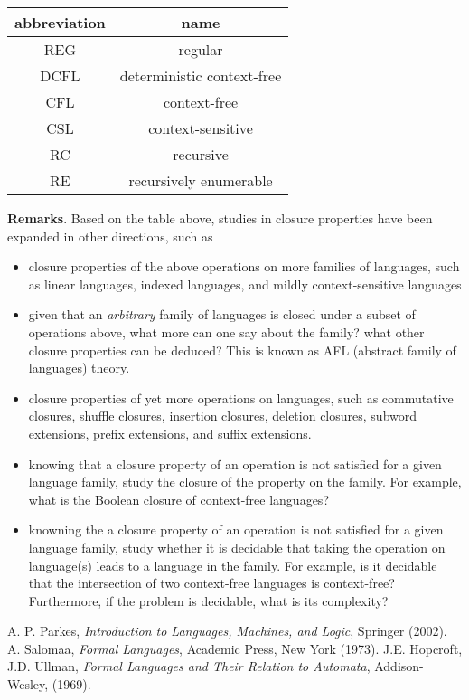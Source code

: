 \documentclass[12pt]{article}
\begin{document}
\begin{center}
\begin{tabular}{|c|c|}
\hline\hline
abbreviation & name \\
\hline\hline
REG & regular \\
\hline
DCFL & deterministic context-free \\
\hline
CFL & context-free \\
\hline
CSL & context-sensitive \\
\hline
RC & recursive \\
\hline
RE & recursively enumerable \\
\hline
\end{tabular}
\end{center}

\textbf{Remarks}.  Based on the table above, studies in closure properties have been expanded in other directions, such as
\begin{itemize}
\item closure properties of the above operations on more families of languages, such as linear languages, indexed languages, and mildly context-sensitive languages
\item given that an \emph{arbitrary} family of languages is closed under a subset of operations above, what more can one say about the family?  what other closure properties can be deduced? This is known as AFL (abstract family of languages) theory.
\item closure properties of yet more operations on languages, such as commutative closures, shuffle closures, insertion closures, deletion closures, subword extensions, prefix extensions, and suffix extensions.
\item knowing that a closure property of an operation is not satisfied for a given language family, study the closure of the property on the family.  For example, what is the Boolean closure of context-free languages?
\item knowning the a closure property of an operation is not satisfied for a given language family, study whether it is decidable that taking the operation on language(s) leads to a language in the family.  For example, is it decidable that the intersection of two context-free languages is context-free?  Furthermore, if the problem is decidable, what is its complexity?
\end{itemize}

\begin{thebibliography}{9}
 A. P. Parkes, {\em Introduction to Languages, Machines, and Logic}, Springer (2002).
 A. Salomaa, {\em Formal Languages}, Academic Press, New York (1973).
 J.E. Hopcroft, J.D. Ullman, {\em Formal Languages and Their Relation to Automata}, Addison-Wesley, (1969).
\end{thebibliography}
\end{document}

